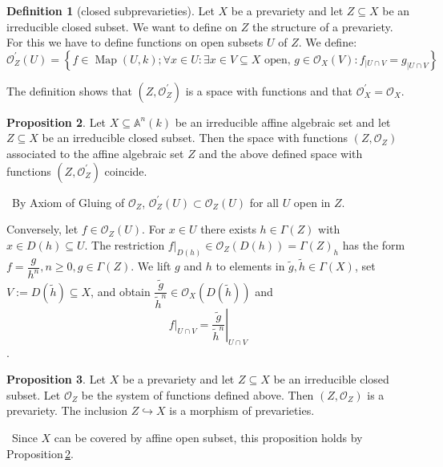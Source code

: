 \documentclass[12pt,a4paper]{book}
\newenvironment{prooff}{{\noindent\it\textcolor{cyan!40!black}{Proof}:}\,}{\par}
\newcommand{\p}{^{\prime}}
\theoremstyle{definition}
\newtheorem{defn}{Definition}[section]
\newtheorem{prop}[defn]{Proposition}
\begin{document}
\begin{defn}[closed subprevarieties]
    Let $X$ be a prevariety and let $Z \subseteq X$ be an irreducible closed subset. We want to define on $Z$ the structure of a prevariety. For this we have to define functions on open subsets $U$ of $Z$. We define:
    $$
    \mathscr{O}_Z^{\prime}(U)=\left\{f \in \operatorname{Map}(U, k) ; \forall x \in U: \exists x \in V \subseteq X \text { open, } g \in \mathscr{O}_X(V): f_{\mid U \cap V}=g_{\mid U \cap V}\right\}
    $$
    
The definition shows that $\left(Z, \mathscr{O}_Z^{\prime}\right)$ is a space with functions and that $\mathscr{O}_X^{\prime}=\mathscr{O}_X$.
\end{defn}
\begin{prop}
Let $X \subseteq \mathbb{A}^n(k)$ be an irreducible affine algebraic set and let $Z \subseteq X$ be an irreducible closed subset. Then the space with functions $\left(Z, \mathscr{O}_Z\right)$ associated to the affine algebraic set $Z$ and the above defined space with functions $\left(Z, \mathscr{O}_Z^{\prime}\right)$ coincide.
\label{proposition: closed subprevariety of affine variety}
\end{prop}
\begin{prooff}
    By Axiom of Gluing of $\mathscr{O}_Z$, $\mathscr{O}\p_Z(U)\subset \mathscr{O}_Z(U)$ for all $U$ open in $Z$.

    Conversely, let $f \in \mathscr{O}_Z(U)$. For $x \in U$ there exists $h \in \Gamma(Z)$ with $x \in D(h) \subseteq U$. 
    The restriction $\left.f\right|_{D(h)}\in \mathscr{O}_Z(D(h))=\Gamma(Z)_h$ has the form $f=\dfrac{g}{h^n}, n \geq 0, g \in \Gamma(Z)$. 
    We lift $g$ and $h$ to elements in $\tilde{g}, \tilde{h} \in \Gamma(X)$, set $V:=D(\tilde{h}) \subseteq X$, 
    and obtain $\dfrac{\tilde{g}}{\tilde{h}^n} \in \mathscr{O}_X(D(\tilde{h}))$ and 
    $$\left.f\right|_{U\cap V}=\left.\frac{\tilde{g}}{\tilde{h}^n}\right|_{U\cap V}$$.
\end{prooff}
\begin{prop}
    Let $X$ be a prevariety and let $Z \subseteq X$ be an irreducible closed subset. Let $\mathscr{O}_Z$ be the system of functions defined above. Then $\left(Z, \mathscr{O}_Z\right)$ is a prevariety. The inclusion $Z \hookrightarrow X$ is a morphism of prevarieties.
\end{prop}
\begin{prooff}
    Since $X$ can be covered by affine open subset, this proposition holds by Proposition\,\ref{proposition: closed subprevariety of affine variety}.
\end{prooff}
\end{document}
